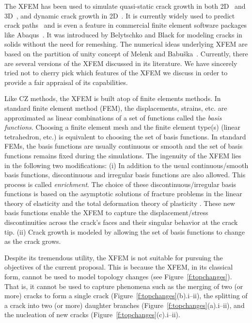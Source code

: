 \documentclass[10pt,letterpaper]{article}
\begin{document}
%
    The XFEM has been used to  simulate quasi-static crack growth in both 2D~\cite{belytschko1999elastic,bordas2007extended,dolbow_1999} and 3D~\cite{sukumar2000extended,moes2002non,gravouil2002non}, and dynamic crack growth in 2D~\cite{belytschko2003dynamic,song2006method}. It is currently widely used to predict crack paths~\cite{golewski2012numerical,barkai2012crack,peng2017extended} and is even a feature in commercial finite element software packages like Abaqus~\cite{abaqus2014}. It was introduced by Belytschko and Black \cite{belytschko1999elastic} for modeling cracks in solids without the need for remeshing. The numerical ideas underlying XFEM  are based on the partition of unity concept of Melenk and Babu\v ska~\cite{melenk1996partition}.  Currently, there are several versions of the XFEM  discussed in its literature. We have sincerely tried not to cherry pick which features of the XFEM we discuss in order to provide a fair appraisal of its capabilities.

    Like CZ methods, the XFEM is built atop of finite elements methods. In  standard finite element method (FEM), the displacements, strains, etc. are approximated as  linear combinations of a set of functions called  the \textit{basis functions}. Choosing a finite element mesh and the finite element type(s) (linear tetrahedron, etc.) is equivalent to choosing the set of basis functions. In standard FEMs, the basis functions are usually continuous or smooth and the set of basis functions remains fixed during the simulations. The ingenuity of the XFEM lies in the following two modifications: (i) In addition to the usual continuous/smooth basis functions, discontinuous and irregular basis functions are also allowed. This process is called \textit{enrichment}. The choice of these discontinuous/irregular basis functions is  based  on the asymptotic solutions of fracture problems in the linear theory of elasticity \cite{sukumar2004partition} and the total deformation theory of plasticity \cite{elguedj2006appropriate}. These new basis functions enable the XFEM to capture the displacement\slash stress discontinuities across the crack's faces and their singular behavior at the crack tip. (ii) Crack growth is modeled by allowing the set of basis functions to change as the crack grows.

    Despite its tremendous utility,  the XFEM is not suitable for pursuing the objectives of the current proposal. This is  because  the XFEM, in its classical form, cannot  be used to  model topology changes (see Figure~\ref{f:topchanges}). That is, it cannot  be used to capture phenomena such as  the merging of two (or more)  cracks to  form a single crack (Figure~\ref{f:topchanges}(b).i--ii), the splitting of a crack into two (or more)  daughter branches (Figure~\ref{f:topchanges}(a).i--ii), and  the nucleation of new cracks (Figure~\ref{f:topchanges}(c).i--ii).
\end{document}
